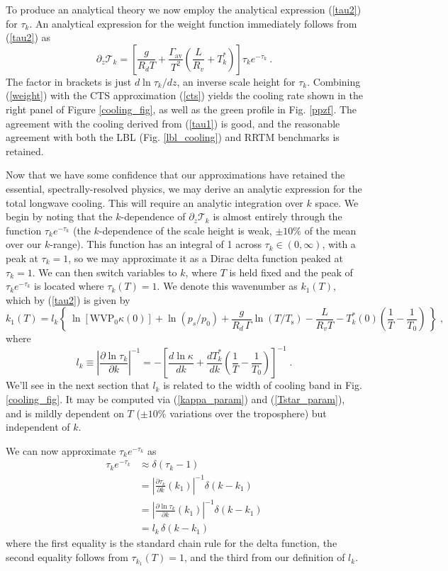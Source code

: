 \documentclass[10pt]{article}
\newcommand{\beqn}{\begin{equation}}
\newcommand{\eeqn}{\end{equation}}
\newcommand{\eqnref}[1]{(\ref{#1})}
\newcommand{\n}{\nonumber}
\newcommand{\inverse}{^{-1}}
\newcommand{\partialderf}[2]{\ensuremath{\frac{\partial #1}{\partial #2}}}
\newcommand{\der}[2]{\ensuremath{\frac{d #1}{d #2}}}
\newcommand{\ppz}{\ensuremath{\partial_z}}
\newcommand{\trans}{\ensuremath{\mathcal{T}}}
\newcommand{\tauk}{\ensuremath{\tau_k}}
\newcommand{\Ts}{\ensuremath{T_\mathrm{s}}}
\newcommand{\ps}{\ensuremath{p_s}}
\newcommand{\WVP}{\ensuremath{\mathrm{WVP}}}
\newcommand{\gammaav}{\ensuremath{\Gamma_\mathrm{av}}}
\begin{document}
To produce an analytical theory we now employ the analytical expression \eqnref{tau2} for \tauk. An analytical expression for the weight function  immediately follows from \eqnref{tau2} as 
	\beqn
		\ppz \trans_k = \left[\frac{g}{R_d T} + \frac{ \gammaav}{ T^2}\left(\frac{L}{R_v} + T_k^*\right) \right] \tau_k e^{-\tau_k}  \ .
	\label{weight}
	\eeqn
 The factor  in brackets is just $d \ln \tau_k/dz$,  an inverse scale height for $\tau_k$. Combining \eqnref{weight}  with the CTS approximation \eqnref{cts}  yields the cooling rate shown in the right panel of Figure \ref{cooling_fig}, as well as the green profile in Fig. \ref{ppzf}.  The agreement with the cooling derived from \eqnref{tau1} is good, and the reasonable agreement with both the LBL (Fig. \ref{lbl_cooling}) and RRTM benchmarks is retained.

Now that we have some confidence that our approximations have retained the essential, spectrally-resolved physics,  we may derive an analytic expression for the total longwave cooling. This will require an analytic integration over $k$ space. We begin by noting that the $k$-dependence of $\ppz \trans_k$ is almost entirely through the function $\tau_k e^{-\tau_k}$ (the $k$-dependence of the scale height is weak, $\pm 10 \%$ of the mean over our $k$-range).  This function has an integral of 1 across $\tauk\in (0,\infty)$, with a peak at $\tau_k=1$, so we may approximate it as a Dirac delta function peaked at $\tau_k=1$. We can then switch variables to $k$, where $T$ is held fixed and the peak of $\tau_k e^{-\tau_k}$ is located where	$\tau_{k}(T)=1$. We denote this wavenumber as $k_1(T)$, which by  \eqnref{tau2} is given by 
	\beqn
		k_1(T) =  l_k\left\{\ \ln[ \WVP_0\kappa(0)] + \ln(\ps/p_0) + \frac{g}{R_d\,\Gamma}\ln(T/\Ts) - 
				\frac{L}{R_vT} - T_k^*(0)\left(\frac{1}{T}-\frac{1}{T_0}\right)\  \right\} \; ,
	\label{k1}
	\eeqn
	where 
	\beqn
		l_k \equiv  \left|\frac{\partial \ln \tau_k}{\partial k}\right|\inverse= -\left[ \der{\ln \kappa}{k}+\der{T^*_k}{k}\left(\frac{1}{T}-\frac{1}{T_0}\right)\right]^{-1} \; .
	\n
	\eeqn
	We'll see in the next section that $l_k$ is related to the width of cooling band in Fig. \ref{cooling_fig}. It may be computed via \eqnref{kappa_param} and \eqnref{Tstar_param}, and is mildly dependent on $T$ ($\pm 10\%$ variations over the troposphere) but independent of $k$. 
	
	 We can now approximate $\tau_k e^{-\tau_k}$ as 
	\begin{align}
		\tau_k e^{-\tau_k} & \approx \delta(\tau_k- 1)  \n \\
					    & = \left|\partialderf{\tau_k}{k}(k_1)\right|\inverse\delta(k-k_1) \n  \\
					    & =  \left|\partialderf{\ln\tau_k}{k}(k_1)\right|\inverse\delta(k-k_1) \n  \\ 
					    & = l_k\,  \delta(k-k_1) \label{delta_approx}
	\end{align}
where the first equality is the standard chain rule for the delta function, the second equality follows from $\tau_{k_1}(T)=1$, and the third from our definition of  $l_k$.
\end{document}
